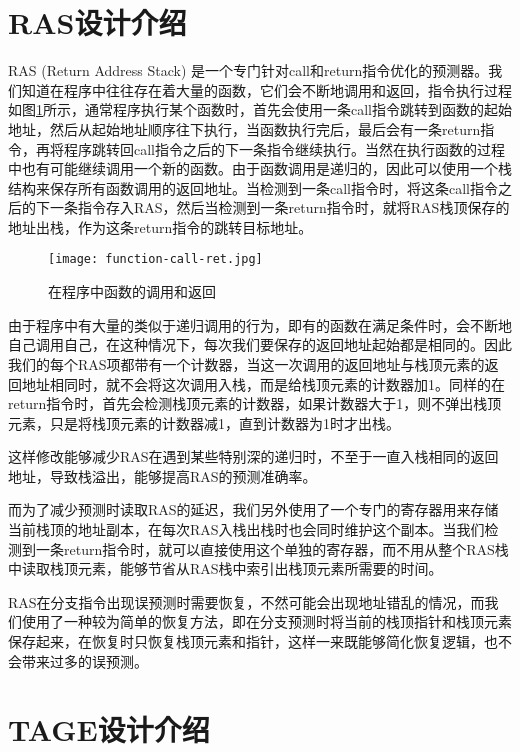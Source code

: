 \section{RAS设计介绍}

RAS (Return Address Stack) 是一个专门针对call和return指令优化的预测器。我们知道在程序中往往存在着大量的函数，它们会不断地调用和返回，指令执行过程如图\ref{fig:figure22}所示，通常程序执行某个函数时，首先会使用一条call指令跳转到函数的起始地址，然后从起始地址顺序往下执行，当函数执行完后，最后会有一条return指令，再将程序跳转回call指令之后的下一条指令继续执行。当然在执行函数的过程中也有可能继续调用一个新的函数。由于函数调用是递归的，因此可以使用一个栈结构来保存所有函数调用的返回地址。当检测到一条call指令时，将这条call指令之后的下一条指令存入RAS，然后当检测到一条return指令时，就将RAS栈顶保存的地址出栈，作为这条return指令的跳转目标地址。

\begin{figure}[htb]
	\centering
	\setlength\tabcolsep{3pt}  %
	\vspace{5pt} %
	\texttt{[image: function-call-ret.jpg]}
	\caption{在程序中函数的调用和返回}
	\label{fig:figure22}
\end{figure}

由于程序中有大量的类似于递归调用的行为，即有的函数在满足条件时，会不断地自己调用自己，在这种情况下，每次我们要保存的返回地址起始都是相同的。因此我们的每个RAS项都带有一个计数器，当这一次调用的返回地址与栈顶元素的返回地址相同时，就不会将这次调用入栈，而是给栈顶元素的计数器加1。同样的在return指令时，首先会检测栈顶元素的计数器，如果计数器大于1，则不弹出栈顶元素，只是将栈顶元素的计数器减1，直到计数器为1时才出栈。

这样修改能够减少RAS在遇到某些特别深的递归时，不至于一直入栈相同的返回地址，导致栈溢出，能够提高RAS的预测准确率。

而为了减少预测时读取RAS的延迟，我们另外使用了一个专门的寄存器用来存储当前栈顶的地址副本，在每次RAS入栈出栈时也会同时维护这个副本。当我们检测到一条return指令时，就可以直接使用这个单独的寄存器，而不用从整个RAS栈中读取栈顶元素，能够节省从RAS栈中索引出栈顶元素所需要的时间。

RAS在分支指令出现误预测时需要恢复，不然可能会出现地址错乱的情况，而我们使用了一种较为简单的恢复方法，即在分支预测时将当前的栈顶指针和栈顶元素保存起来，在恢复时只恢复栈顶元素和指针，这样一来既能够简化恢复逻辑，也不会带来过多的误预测。

\section{TAGE设计介绍}

